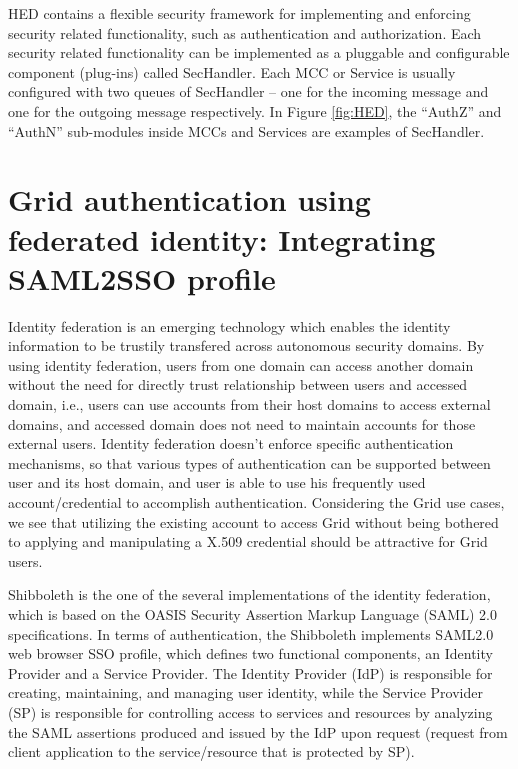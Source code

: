 \documentclass[conference]{IEEEtran}
\begin{document}
HED contains a flexible security framework for implementing and enforcing security 
related functionality, such as authentication and authorization. 
Each security related functionality can be implemented as a pluggable and configurable 
component (plug-ins) called SecHandler. Each MCC or Service is usually configured with 
two queues of SecHandler -- one for the incoming message and one for the outgoing message 
respectively. In Figure \ref{fig:HED}, the ``AuthZ'' and ``AuthN'' sub-modules inside 
MCCs and Services are examples of SecHandler.

\section{Grid authentication using federated identity: Integrating SAML2SSO profile}
\label{sec:intergrationSAML2SSO}
Identity federation is an emerging technology which enables the identity information to be 
trustily transfered across autonomous security domains. By using identity federation, users 
from one domain can access another domain without the need for directly trust relationship 
between users and accessed domain, i.e., users can use accounts from their host domains to 
access external domains, and accessed domain does not need to maintain accounts for those 
external users. Identity federation doesn't enforce specific authentication mechanisms, so 
that various types of authentication can be supported between user and its host domain, and 
user is able to use his frequently used account/credential to accomplish authentication. 
Considering the Grid use cases, we see that utilizing the existing account to access Grid 
without being bothered to applying and manipulating a X.509 credential should be attractive 
for Grid users.

Shibboleth is the one of the several implementations of the identity federation, which is 
based on the OASIS Security Assertion Markup Language (SAML) 2.0 specifications. In terms 
of authentication, the Shibboleth implements SAML2.0 web browser SSO profile, which  defines 
two functional components, an Identity Provider and a Service Provider. The Identity Provider 
(IdP) is responsible for creating, maintaining, and managing user identity, while the Service 
Provider (SP) is responsible for controlling access to services and resources by analyzing 
the SAML assertions produced and issued by the IdP upon request (request from client application 
to the service/resource that is protected by SP).
\end{document}
